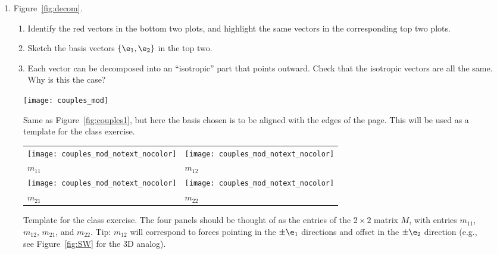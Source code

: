 \documentclass[11pt,titlepage,fleqn]{article}
\begin{document}
\begin{enumerate}

\item Figure~\ref{fig:decom}.
%
\begin{enumerate}
\item Identify the red vectors in the bottom two plots, and highlight the same vectors in the corresponding top two plots.
\item Sketch the basis vectors $\{\e_1,\e_2\}$ in the top two.
\item Each vector can be decomposed into an ``isotropic'' part that points outward. Check that the isotropic vectors are all the same. Why is this the case?
\end{enumerate}

\end{enumerate}







\begin{figure}
\centering
\texttt{[image: couples\_mod]}
\caption{
Same as Figure~\ref{fig:couples1}, but here the basis chosen is to be aligned with the edges of the page.
This will be used as a template for the class exercise.
\label{fig:template}
}
\end{figure}


\begin{figure}
\centering
\begin{tabular}{|l|l|}
\hline
\texttt{[image: couples\_mod\_notext\_nocolor]} & 
\texttt{[image: couples\_mod\_notext\_nocolor]} \\
$m_{11}$ & $m_{12}$ \\ \hline
\texttt{[image: couples\_mod\_notext\_nocolor]} &
\texttt{[image: couples\_mod\_notext\_nocolor]} \\
$m_{21}$ & $m_{22}$ \\ \hline
\end{tabular}
\caption{
Template for the class exercise.
The four panels should be thought of as the entries of the $2 \times 2$ matrix $M$, with entries $m_{11}$, $m_{12}$, $m_{21}$, and $m_{22}$.
Tip: $m_{12}$ will correspond to forces pointing in the $\pm\e_1$ directions and offset in the $\pm\e_2$ direction (e.g., see Figure~\ref{fig:SW} for the 3D analog).
\label{fig:template4}
}
\end{figure}
\end{document}
